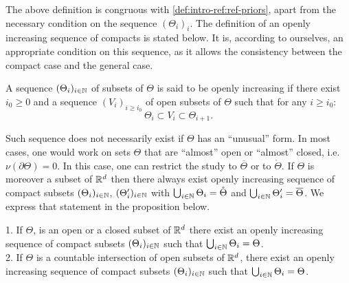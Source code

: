 The above definition is congruous with \cref{def:intro-ref:ref-priors}, apart from the necessary condition on the sequence $(\Theta_i)_i$. 
The definition of an openly increasing sequence of compacts
is stated below. It is, according to ourselves, an appropriate condition on this sequence, as it allows the consistency between the compact case and the general case.


\begin{defi}
    A sequence $(\Theta_i)_{i\in \mathbb{N}}$ of subsets of $\Theta$ is said to be openly increasing if there exist $i_0\geq0$ and a sequence $(V_i)_{i\geq i_0}$ of open subsets of $\Theta$ such that for any $i\geq i_0$:
    \begin{equation}
        \Theta_i\subset V_i\subset\Theta_{i+1}.
    \end{equation}
\end{defi}


Such sequence does not necessarily exist if $\Theta$ has an ``unusual'' form. 
In most cases, one would work on sets $\Theta$ that are ``almost'' open or ``almost'' closed, i.e. $\nu(\partial\Theta)=0$. In this case, one can restrict the study to $\overline{\Theta}$ or to $\mathring{\Theta}$. If $\Theta$ is moreover a subset of $\mathbb{R}^d$ then there always exist openly increasing sequence of compact subsets $(\Theta_i)_{i\in\mathbb{N}}$, $(\Theta'_i)_{i\in\mathbb{N}}$ with $\bigcup_{i\in\mathbb{N}}\Theta_i=\mathring{\Theta}$ and $\bigcup_{i\in\mathbb{N}}\Theta_i'=\overline{\Theta}$. We express that statement in the proposition below.


% 
\begin{prop}
     1. If $\Theta$, is an open or a closed subset of $\mathbb{R}^d$ there exist an openly increasing sequence of compact subsets $(\Theta_i)_{i\in\mathbb{N}}$ such that $\bigcup_{i\in\mathbb{N}}\Theta_i=\Theta$.\\
     2. If $\Theta$ is a countable intersection of open subsets of $\mathbb{R}^d$, there exist an openly increasing sequence of compact subsets $(\Theta_i)_{i\in\mathbb{N}}$ such that $\bigcup_{i\in\mathbb{N}}\Theta_i=\Theta$.
\end{prop}

